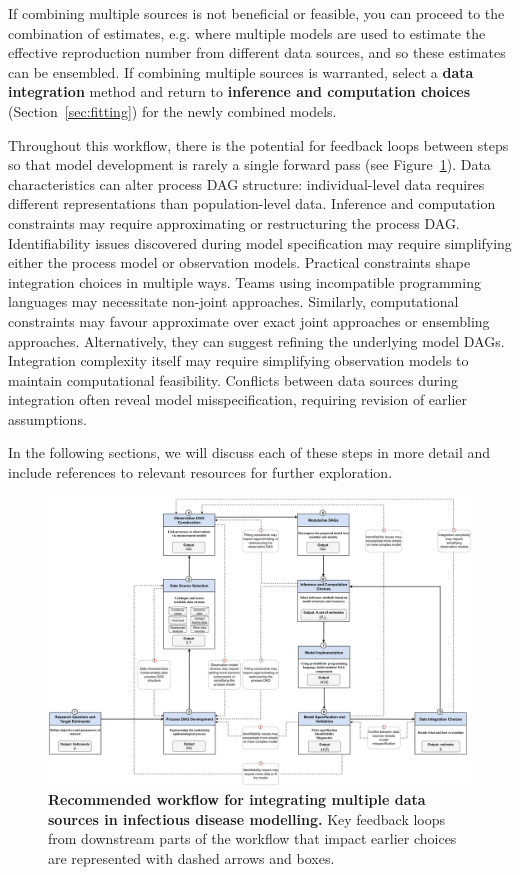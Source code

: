 \documentclass{article}
\begin{document}
If combining multiple sources is not beneficial or feasible, you can proceed to the combination of estimates, e.g. where multiple models are used to estimate the effective reproduction number from different data sources, and so these estimates can be ensembled.
If combining multiple sources is warranted, select a \textbf{data integration} method and return to \textbf{inference and computation choices} (Section~\ref{sec:fitting}) for the newly combined models.

Throughout this workflow, there is the potential for feedback loops between steps so that model development is rarely a single forward pass (see Figure~\ref{fig:workflow}). 
Data characteristics can alter process DAG structure: individual-level data requires different representations than population-level data. 
Inference and computation constraints may require approximating or restructuring the process DAG.
Identifiability issues discovered during model specification may require simplifying either the process model or observation models. 
Practical constraints shape integration choices in multiple ways. 
Teams using incompatible programming languages may necessitate non-joint approaches. 
Similarly, computational constraints may favour approximate over exact joint approaches or ensembling approaches.
Alternatively, they can suggest refining the underlying model DAGs.
Integration complexity itself may require simplifying observation models to maintain computational feasibility. 
Conflicts between data sources during integration often reveal model misspecification, requiring revision of earlier assumptions.

In the following sections, we will discuss each of these steps in more detail and include references to relevant resources for further exploration.

\begin{landscape}
\begin{figure}[htbp]
    \centering
    \includegraphics[width=\textwidth]{figures/restructured_workflow.drawio.pdf}
    \caption{\textbf{Recommended workflow for integrating multiple data sources in infectious disease modelling.} Key feedback loops from downstream parts of the workflow that impact earlier choices are represented with dashed arrows and boxes.}
    \label{fig:workflow}
\end{figure}
\end{landscape}
\end{document}

